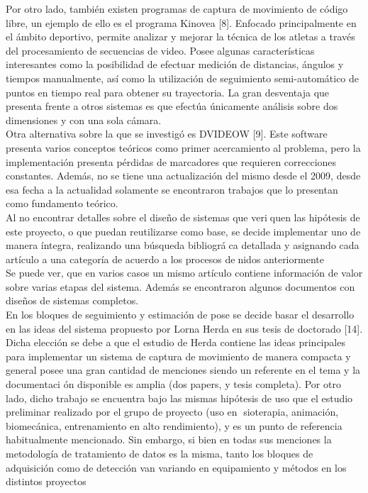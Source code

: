 Por otro lado, también existen programas de captura de movimiento de código
libre, un ejemplo de ello es el programa Kinovea [8]. Enfocado principalmente en el
ámbito deportivo, permite analizar y mejorar la técnica de los atletas a través del
procesamiento de secuencias de video. Posee algunas características interesantes
como la posibilidad de efectuar medición de distancias, ángulos y tiempos manualmente,
así como la utilización de seguimiento semi-automático de puntos en
tiempo real para obtener su trayectoria. La gran desventaja que presenta frente a
otros sistemas es que efectúa únicamente análisis sobre dos dimensiones y con una
sola cámara.\\

Otra alternativa sobre la que se investigó es DVIDEOW [9]. Este software presenta
varios conceptos teóricos como primer acercamiento al problema, pero la
implementación presenta pérdidas de marcadores que requieren correcciones constantes.
Además, no se tiene una actualización del mismo desde el 2009, desde esa
fecha a la actualidad solamente se encontraron trabajos que lo presentan como
fundamento teórico.\\


Al no encontrar detalles sobre el diseño de sistemas que veriquen las hipótesis
de este proyecto, o que puedan reutilizarse como base, se decide implementar uno
de manera íntegra, realizando una búsqueda bibliográca detallada y asignando cada
artículo a una categoría de acuerdo a los procesos denidos anteriormente\\

Se puede ver, que en varios casos un mismo artículo contiene información de
valor sobre varias etapas del sistema. Además se encontraron algunos documentos
con diseños de sistemas completos.\\

En los bloques de seguimiento y estimación de pose se decide basar el desarrollo
en las ideas del sistema propuesto por Lorna Herda en sus tesis de doctorado [14].
Dicha elección se debe a que el estudio de Herda contiene las ideas principales para
implementar un sistema de captura de movimiento de manera compacta y general
posee una gran cantidad de menciones siendo un referente en el tema y la documentaci
ón disponible es amplia (dos papers, y tesis completa). Por otro lado, dicho
trabajo se encuentra bajo las mismas hipótesis de uso que el estudio preliminar
realizado por el grupo de proyecto (uso en sioterapia, animación, biomecánica,
entrenamiento en alto rendimiento), y es un punto de referencia habitualmente
mencionado. Sin embargo, si bien en todas sus menciones la metodología de tratamiento
de datos es la misma, tanto los bloques de adquisición como de detección
van variando en equipamiento y métodos en los distintos proyectos\\

